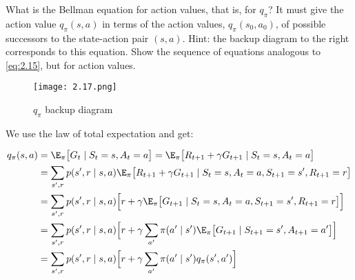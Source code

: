 \begin{exercise}
What is the Bellman equation for action values, that is, for $q_\pi$?
It must give the action value $q_\pi(s, a)$ in terms of the action values, $q_\pi(s_0, a_0)$, of possible successors to the state-action pair $(s, a)$.
Hint:
the backup diagram to the right corresponds to this equation.
Show the sequence of equations analogous to \eqref{eq:2.15}, but for action values.

\begin{figure}[H]
    \centering
    \texttt{[image: 2.17.png]}
    \caption{$q_\pi$ backup diagram}
    \label{fig:2.17}
\end{figure}

\end{exercise}

\begin{solution}
  We use the law of total expectation and get:

  \begin{align*}
    q_\pi(s,a)
    &=
    \E_\pi\big[G_t \mid S_t = s, A_t = a\big]
    =
    \E_\pi\big[R_{t+1} + \gamma G_{t+1}\mid S_t = s, A_t = a\big] \\
    &=
    \sum_{s^\prime, r} p(s^\prime, r \mid s,a) \E_\pi\big[R_{t+1} + \gamma G_{t+1} \mid S_t = s, A_t = a, S_{t+1} = s^\prime, R_{t+1} = r\big]  \\
    &=
    \sum_{s^\prime, r} p(s^\prime, r \mid s,a) \Big[r + \gamma \E_\pi\big[G_{t+1} \mid S_t = s, A_t = a, S_{t+1} = s^\prime, R_{t+1} = r\big]\Big] \\
    &=
    \sum_{s^\prime, r} p(s^\prime, r \mid s,a) \Big[r + \gamma \sum_{a^\prime}\pi(a^\prime\mid s^\prime)\E_\pi\big[G_{t+1}\mid S_{t+1} = s^\prime, A_{t+1} = a^\prime \big]\Big] \\
    &=
    \sum_{s^\prime, r} p(s^\prime, r \mid s,a) \Big[r + \gamma \sum_{a^\prime}\pi(a^\prime\mid s^\prime)q_\pi(s^\prime,a^\prime)\Big]
  \end{align*}
\end{solution}
